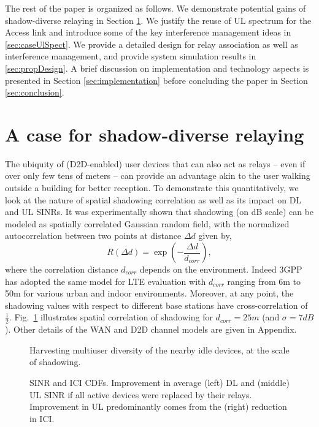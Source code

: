 \documentclass[journal]{IEEEtran}
\begin{document}
The rest of the paper is organized as follows.
We demonstrate potential gains of  shadow-diverse relaying in Section \ref{sec:caseOppRly}.
We justify the reuse of UL spectrum for the Access link and introduce some of the key interference management ideas in \ref{sec:caseUlSpect}.
We provide a detailed design for relay association as well as interference management, and provide system simulation results in \ref{sec:propDesign}.
A brief discussion on implementation and technology aspects is presented in Section \ref{sec:implementation} before concluding the paper in Section \ref{sec:conclusion}.



\section{A case for shadow-diverse relaying}
\label{sec:caseOppRly}

The ubiquity of (D2D-enabled) user devices that can also act as relays -- even if over only few tens of meters -- can provide an advantage akin to the user walking outside a building for better reception. To demonstrate this quantitatively, we look at the nature of spatial shadowing correlation as well as its impact on DL and UL SINRs.  It was experimentally shown \cite{Gudmundson91} that shadowing (on dB scale) can be modeled as spatially correlated Gaussian random field, with the normalized autocorrelation between two points at distance $\Delta d$ given by,
$$
	R(\Delta d) = \exp(-\frac{\Delta d}{d_{corr}}),
$$
where the correlation distance $d_{corr}$ depends on the environment.  Indeed 3GPP has adopted the same model for LTE  evaluation \cite[Sec.~B.1.2.1.1]{3GPP36814} with $d_{corr}$ ranging from 6m to 50m for various urban and indoor environments.  Moreover, at any point, the shadowing values with respect to different base stations have cross-correlation of $\frac{1}{2}$. Fig.~\ref{fig:concept} illustrates spatial correlation of shadowing for $d_{corr}=25m$ (and $\sigma=7dB$). Other details of the WAN and D2D channel models are given in Appendix.

\begin{figure}
\centering
{}
\caption{Harvesting multiuser diversity of the nearby idle devices, at the scale of shadowing. }
\label{fig:concept}
\end{figure}
\begin{figure*}
\centering
{}
\caption{SINR and ICI CDFs.  Improvement in average (left) DL and (middle) UL SINR if all active devices were replaced by their relays. Improvement in UL predominantly comes from the (right) reduction in ICI.}
\label{fig:upperBound}
\end{figure*}
\end{document}
